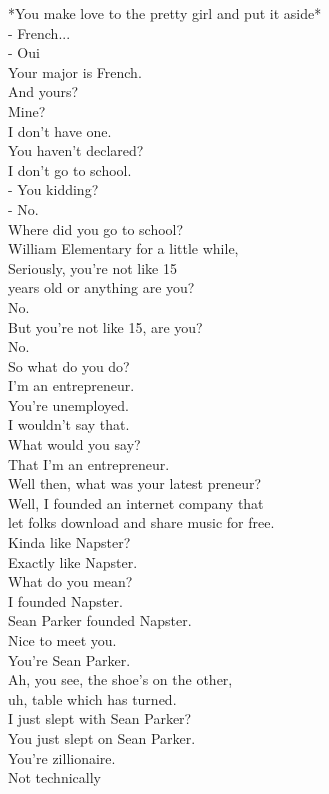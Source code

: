 \documentclass{article}
\begin{document}
\begin{multicols}{3}
*You make love to the pretty girl and put it aside*\\
- French...\\
- Oui\\
Your major is French.\\
And yours?\\
Mine?\\
I don't have one.\\
You haven't declared?\\
I don't go to school.\\
- You kidding?\\
- No.\\
Where did you go to school?\\
William Elementary for a little while,\\
Seriously, you're not like 15\\
years old or anything are you?\\
No.\\
But you're not like 15, are you?\\
No.\\
So what do you do?\\
I'm an entrepreneur.\\
You're unemployed.\\
I wouldn't say that.\\
What would you say?\\
That I'm an entrepreneur.\\
Well then, what was your latest preneur?\\
Well, I founded an internet company that\\
let folks download and share music for free.\\
Kinda like Napster?\\
Exactly like Napster.\\
What do you mean?\\
I founded Napster.\\
Sean Parker founded Napster.\\
Nice to meet you.\\
You're Sean Parker.\\
Ah, you see, the shoe's on the other,\\
uh, table which has turned.\\
I just slept with Sean Parker?\\
You just slept on Sean Parker.\\
You're zillionaire.\\
Not technically\\

\end{multicols}
\end{document}
